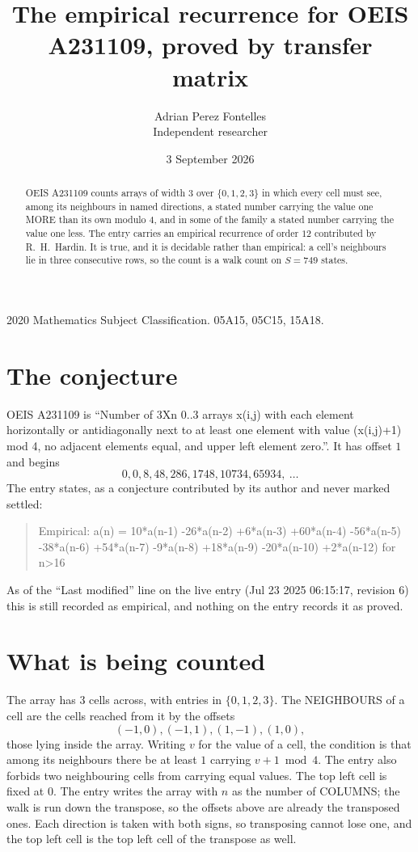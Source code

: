 \documentclass[11pt,a4paper]{article}
\title{The empirical recurrence for OEIS A231109, proved by transfer matrix}
\author{Adrian Perez Fontelles\\ \small Independent researcher}
\date{3 September 2026}
\theoremstyle{plain}
\theoremstyle{definition}
\begin{document}
\maketitle

\begin{abstract}
OEIS A231109 counts arrays of width $3$ over $\{0,1,2,3\}$ in which every cell must see, among its
neighbours in named directions, a stated number carrying the value one MORE than its own
modulo $4$, and in some of the family a stated number carrying the value one less. The entry
carries an empirical recurrence of order $12$ contributed by R.~H.~Hardin. It is true, and
it is decidable rather than empirical: a cell's neighbours lie in three consecutive rows, so
the count is a walk count on $S=749$ states.
\end{abstract}

\noindent\small 2020 Mathematics Subject Classification. 05A15, 05C15, 15A18.\normalsize

\section{The conjecture}

OEIS A231109 is ``Number of 3Xn 0..3 arrays x(i,j) with each element horizontally or antidiagonally next to at least one element with value (x(i,j)+1) mod 4, no adjacent elements equal, and upper left element zero.''. It has offset $1$ and begins
\[
0, 0, 8, 48, 286, 1748, 10734, 65934,\ \dots
\]
The entry states, as a conjecture contributed by its author and never marked settled:
\begin{quote}
Empirical: a(n) = 10*a(n-1) -26*a(n-2) +6*a(n-3) +60*a(n-4) -56*a(n-5) -38*a(n-6) +54*a(n-7) -9*a(n-8) +18*a(n-9) -20*a(n-10) +2*a(n-12) for n>16
\end{quote}
As of the ``Last modified'' line on the live entry (Jul 23 2025 06:15:17, revision 6) this is still
recorded as empirical, and nothing on the entry records it as proved.

\section{What is being counted}

The array has $3$ cells across, with entries in $\{0,1,2,3\}$. The NEIGHBOURS of a cell are the
cells reached from it by the offsets
\[
(-1,0), (-1,1), (1,-1), (1,0),
\]
those lying inside the array. Writing $v$ for the value of a cell, the condition is that among
its neighbours there be at least $1$ carrying $v+1 \bmod 4$. The entry also forbids two neighbouring cells from carrying equal values. The top left
cell is fixed at $0$. The entry writes the array with $n$ as the number of COLUMNS; the walk is run down the transpose, so the offsets above are already the transposed ones. Each direction is taken with both signs, so transposing cannot lose one, and the top left cell is the top left cell of the transpose as well.
\end{document}
